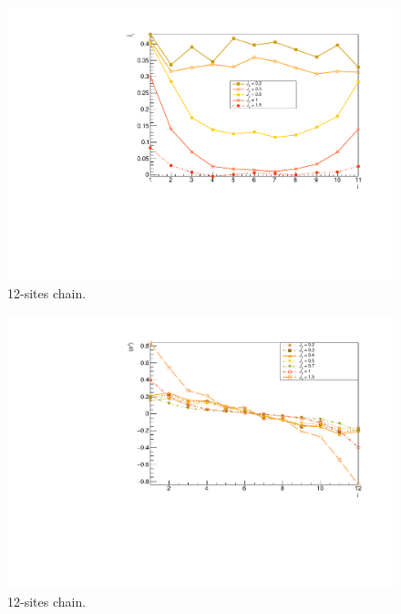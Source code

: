 \begin{figure}[H]
    \centering
    \includegraphics[scale=0.7]{Figures/12sites_spinCurrVSJz.pdf}
    \caption{12-sites chain.}
    \label{fig:my_label}
\end{figure}

\begin{figure}[H]
    \centering
    \includegraphics[scale=0.7]{Figures/12sites/12sites_LMvsJz.pdf}
    \caption{12-sites chain.}
    \label{fig:my_label}
\end{figure}

